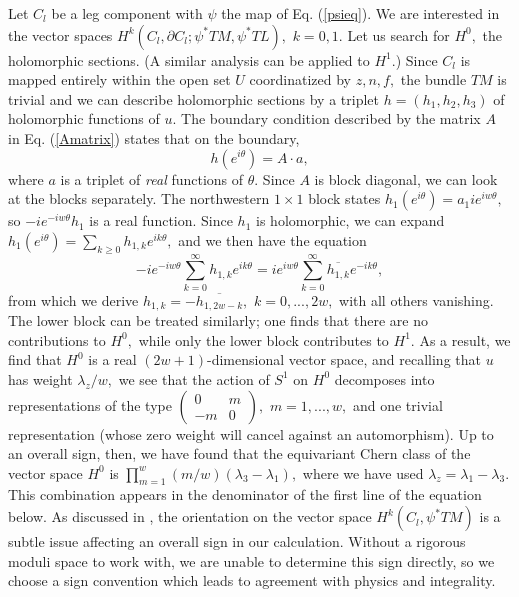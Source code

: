 \documentclass[a4paper,11pt]{article}
\begin{document}
Let $C_l$ be a leg component with $\psi$ the map
of Eq. (\ref{psieq}).  We are interested in the vector
spaces $H^k(C_l,\partial C_l; \psi^*TM,\psi^*TL),$ $k=0,1.$
Let us search for $H^0,$ the holomorphic sections.  (A
similar analysis can be applied to $H^1$.)
Since $C_l$ is mapped entirely
within the open set $U$ coordinatized by
$z, n, f,$ the bundle $TM$ is trivial and we can
describe holomorphic sections by a triplet
$h = (h_1, h_2, h_3)$ of holomorphic functions of $u.$
The boundary condition described by the 
matrix $A$ in Eq. (\ref{Amatrix})
states that on the boundary,
$$h(e^{i\theta}) = A\cdot a,$$ 
where $a$ is a triplet of {\em real} functions of $\theta.$
Since $A$ is block diagonal, we can look at the blocks
separately.  The northwestern $1\times 1$ block states
$h_1(e^{i\theta}) = a_1 i e^{iw\theta},$
so $-ie^{-iw\theta} h_1$ is a real function.
Since $h_1$ is holomorphic, we can expand
$h_1(e^{i\theta}) =
\sum_{k\geq 0}h_{1,k}e^{ik\theta},$
and we then have the equation
$$-ie^{-iw\theta}\sum_{k=0}^{\infty}h_{1,k}e^{ik\theta}=
ie^{iw\theta}\sum_{k=0}^{\infty}
\overline{h_{1,k}}e^{-ik\theta},$$
from which we derive $h_{1,k} = -\overline{h_{1,2w-k}},$
$k = 0,...,2w,$ with all others vanishing.
The lower block can be treated similarly; one
finds that there are no contributions to
$H^0,$ while only the lower block contributes
to $H^1.$
As a result, we find that $H^0$ is a
real $(2w+1)$-dimensional vector space, and recalling
that $u$ has weight $\lambda_z/w,$ we see that the
action of $S^1$ on $H^0$ decomposes into representations
of the type $\begin{pmatrix}0&m\\ -m&0\end{pmatrix},$
$m = 1,...,w,$ and one trivial representation
(whose zero weight will cancel against an automorphism).
Up to an overall sign, then, we have found
that the equivariant Chern class
of the vector space
$H^0$ is $\prod_{m=1}^{w}(m/w)(\lambda_3-
\lambda_1),$
where we have used $\lambda_z = \lambda_1-\lambda_3.$
This combination appears in the denominator of the
first line of the equation below.
As discussed in \cite{FOOO}, the orientation
on the vector space $H^k(C_l,\psi^*TM)$
is a subtle issue affecting an overall sign
in our calculation.  Without a rigorous moduli
space to work with, we are unable to determine this
sign directly, so we choose
a sign convention which leads to agreement with
physics and integrality.
\end{document}
